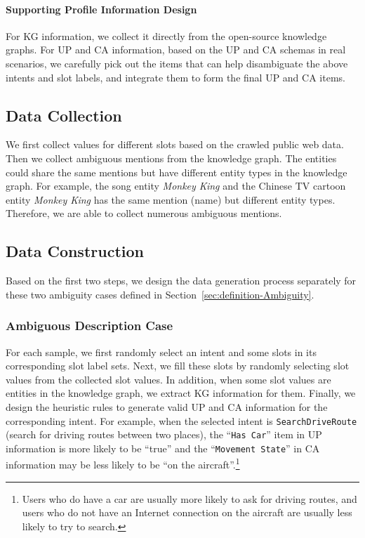 \documentclass[letterpaper]{article} \usepackage{aaai22}  \usepackage{times}  \usepackage{helvet}  \usepackage{courier}  \usepackage[hyphens]{url}  \usepackage{graphicx} \urlstyle{rm} \def\UrlFont{\rm}  \usepackage{natbib}  \usepackage{caption} \DeclareCaptionStyle{ruled}{labelfont=normalfont,labelsep=colon,strut=off} \frenchspacing  \setlength{\pdfpagewidth}{8.5in}  \setlength{\pdfpageheight}{11in}  \usepackage{algorithm}
\begin{document}
\paragraph{Supporting Profile Information Design}
For KG information, we collect it directly from the open-source knowledge graphs.
For UP and CA information, based on the UP and CA schemas in real scenarios,
we carefully pick out the items that can help disambiguate the above intents and slot labels, and integrate them to form the final UP and CA items. 

\subsection{Data Collection}
We first collect values for different slots based on the crawled public web data.
Then we collect ambiguous mentions from the knowledge graph.
The entities could share the same mentions but have different entity types in the knowledge graph.
For example, the song entity \textit{Monkey King} and the Chinese TV cartoon entity \textit{Monkey King} has the same mention (name) but different entity types. 
Therefore, we are able to collect numerous ambiguous mentions.

\subsection{Data Construction}
Based on the first two steps, we design the data generation process separately for these two ambiguity cases defined 
in Section~\ref{sec:definition-Ambiguity}.
\subsubsection{Ambiguous Description Case}
For each sample, we first randomly select an intent and some slots in its corresponding slot label sets.
Next, we fill these slots by randomly selecting slot values from the collected slot values.
In addition, when some slot values are entities in the knowledge graph, we extract KG information for them. 
Finally, we design the heuristic rules to generate valid UP and CA information for the corresponding intent.
For example, when the selected intent is \texttt{SearchDriveRoute} (search for driving routes between two places), 
the ``\texttt{Has Car}'' item in UP information is more likely to be ``true'' and 
the ``\texttt{Movement State}'' in CA information may be less likely to be ``on the aircraft''.\footnote{Users who do have a car are usually more likely to ask for driving routes, and users who do not have an Internet connection on the aircraft are usually less likely to try to search.}
\end{document}
